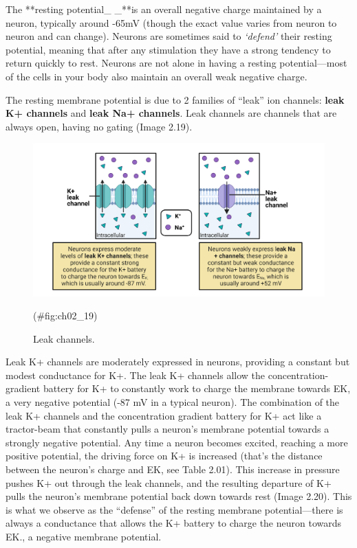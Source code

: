 \documentclass[
]{book}
\begin{document}
The **resting potential\_ \_**is an overall negative charge maintained by a neuron, typically around -65mV (though the exact value varies from neuron to neuron and can change). Neurons are sometimes said to \emph{`defend'} their resting potential, meaning that after any stimulation they have a strong tendency to return quickly to rest. Neurons are not alone in having a resting potential---most of the cells in your body also maintain an overall weak negative charge.

The resting membrane potential is due to 2 families of ``leak'' ion channels: \textbf{leak K+ channels} and \textbf{leak Na+ channels}. Leak channels are channels that are always open, having no gating (Image 2.19).

\begin{figure}

{\centering \includegraphics[width=0.8\linewidth]{images/ch02/02_19} 

}

\caption{Leak channels.}(\#fig:ch02_19)
\end{figure}

Leak K+ channels are moderately expressed in neurons, providing a constant but modest conductance for K+. The leak K+ channels allow the concentration-gradient battery for K+ to constantly work to charge the membrane towards EK, a very negative potential (-87 mV in a typical neuron). The combination of the leak K+ channels and the concentration gradient battery for K+ act like a tractor-beam that constantly pulls a neuron's membrane potential towards a strongly negative potential. Any time a neuron becomes excited, reaching a more positive potential, the driving force on K+ is increased (that's the distance between the neuron's charge and EK, see Table 2.01). This increase in pressure pushes K+ out through the leak channels, and the resulting departure of K+ pulls the neuron's membrane potential back down towards rest (Image 2.20). This is what we observe as the ``defense'' of the resting membrane potential---there is always a conductance that allows the K+ battery to charge the neuron towards EK., a negative membrane potential.
\end{document}
